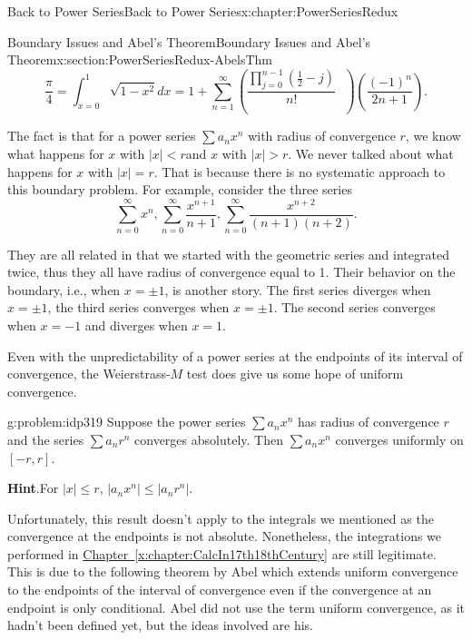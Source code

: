 \begin{chapterptx}{Back to Power Series}{}{Back to Power Series}{}{}{x:chapter:PowerSeriesRedux}
\begin{sectionptx}{Boundary Issues and Abel's Theorem}{}{Boundary Issues and Abel's Theorem}{}{}{x:section:PowerSeriesRedux-AbelsThm}
		\begin{equation*}
			\frac{\pi}{4}=\int_{x=0}^1\sqrt{1-x^2}dx=1+\sum_{n=1}^\infty\left(\frac{\prod_{j=0}^{n-1}\left(\frac{1}{2}-j\right)}{n!}\text{ } \right)\left(\frac{\left(-1\right)^n}{2n+1}\right)\text{.}
		\end{equation*}
		\par
		The fact is that for a power series \(\sum a_nx^n\) with radius of convergence \(r\), we know what happens for \(x\) with \(|x|\lt r\)and \(x\) with \(|x|>r\). We never talked about what happens for \(x\) with \(|x|=r\). That is because there is no systematic approach to this boundary problem. For example, consider the three series%
		\begin{equation*}
			\sum_{n=0}^\infty x^n,\sum_{n=0}^\infty\frac{x^{n+1}}{n+1}, \sum_{n=0}^\infty\frac{x^{n+2}}{(n+1)(n+2)}\text{.}
		\end{equation*}
		\par
		They are all related in that we started with the geometric series and integrated twice, thus they all have radius of convergence equal to 1. Their behavior on the boundary, i.e., when \(x=\pm 1\), is another story. The first series diverges when \(x=\pm 1\), the third series converges when \(x=\pm 1\). The second series converges when \(x=-1\) and diverges when \(x=1\).%
		\par
		Even with the unpredictability of a power series at the endpoints of its interval of convergence, the Weierstrass-\(M\) test does give us some hope of uniform convergence.%
		\begin{problem}{}{g:problem:idp319}%
			Suppose the power series \(\sum a_nx^n\) has radius of convergence \(r\) and the series \(\sum a_nr^n\) converges absolutely. Then \(\sum a_nx^n\) converges uniformly on \([-r,r]\).%
			\par\smallskip%
			\noindent\textbf{\blocktitlefont Hint}.\hypertarget{g:hint:idp320}{}\quad{}For \(|x|\leq r\), \(|a_nx^n|\leq |a_nr^n|\).%
		\end{problem}
		Unfortunately, this result doesn't apply to the integrals we mentioned as the convergence at the endpoints is not absolute. Nonetheless, the integrations we performed in \hyperref[x:chapter:CalcIn17th18thCentury]{Chapter~{\xreffont\ref{x:chapter:CalcIn17th18thCentury}}} are still legitimate. This is due to the following theorem by Abel which  extends uniform convergence to the endpoints of the interval of convergence even if the convergence at an endpoint is only conditional. Abel did not use the term uniform convergence, as it hadn't been defined yet, but the ideas involved are his.%

\end{sectionptx}
\end{chapterptx}
